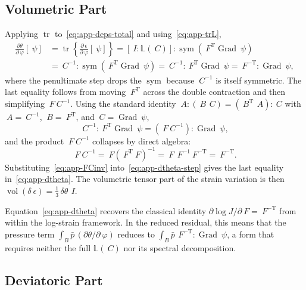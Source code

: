 \documentclass[12pt]{article}
\newcommand{\F}{~F}
\newcommand{\C}{~C}
\newcommand{\eps}{~\epsilon}
\newcommand{\pbar}{\bar{p}}
\DeclareMathOperator{\trace}{tr}
\DeclareMathOperator{\vol}{vol}
\DeclareMathOperator{\Grad}{Grad}
\DeclareMathOperator{\sym}{sym}
\newcommand{\transpose}[1]{{#1}^{\mathrm{T}}}
\begin{document}
\subsection{Volumetric Part}
\label{app:volumetric}

Applying $\trace$ to~\eqref{eq:app-deps-total} and
using~\eqref{eq:app-trL},
\begin{equation}
  \label{eq:app-dtheta}
  \begin{split}
  \frac{\partial \theta}{\partial ~\varphi}[~\psi]
  & =
  \trace\!\left\{
    \frac{\partial \eps}{\partial ~\varphi}[~\psi]
  \right\}
  =
  \left[~I : \mathbb{L}(\C)\right]
  :
  \sym\!\left(\transpose{\F}\Grad ~\psi\right)
  \\
  & =
  \C^{-1} : \sym\!\left(\transpose{\F}\Grad ~\psi\right)
  =
  \C^{-1} : \transpose{\F}\Grad ~\psi
  =
  \F^{-\mathrm{T}} : \Grad ~\psi,
  \end{split}
\end{equation}
where the penultimate step drops the $\sym$ because $\C^{-1}$ is
itself symmetric. The last equality follows from moving
$\transpose{\F}$ across the double contraction and then simplifying
$\F \C^{-1}$. Using the standard identity
$~A : (~B \, ~C) = (\transpose{~B} \, ~A) : ~C$ with
$~A = \C^{-1}$, $~B = \transpose{\F}$, and
$~C = \Grad ~\psi$,
\begin{equation}
  \label{eq:app-dtheta-step}
  \C^{-1} : \transpose{\F}\Grad ~\psi
  =
  \left(\F \C^{-1}\right) : \Grad ~\psi,
\end{equation}
and the product $\F \C^{-1}$ collapses by direct algebra:
\begin{equation}
  \label{eq:app-FCinv}
  \F \C^{-1}
  =
  \F \left(\transpose{\F}\F\right)^{-1}
  =
  \F \, \F^{-1} \F^{-\mathrm{T}}
  =
  \F^{-\mathrm{T}}.
\end{equation}
Substituting~\eqref{eq:app-FCinv} into~\eqref{eq:app-dtheta-step}
gives the last equality in~\eqref{eq:app-dtheta}. The volumetric
tensor part of the strain variation is then
$\vol(\delta \eps) = \tfrac{1}{3}\,\delta \theta\, ~I$.

Equation~\eqref{eq:app-dtheta} recovers the classical identity
$\partial \log J / \partial \F = \F^{-\mathrm{T}}$ from within the
log-strain framework. In the reduced residual, this means that the
pressure term $\int_B \pbar\,(\partial \theta / \partial ~\varphi)$
reduces to $\int_B \pbar\, \F^{-\mathrm{T}} : \Grad ~\psi$, a form
that requires neither the full $\mathbb{L}(\C)$ nor its spectral
decomposition.

\subsection{Deviatoric Part}
\label{app:deviatoric}
\end{document}
